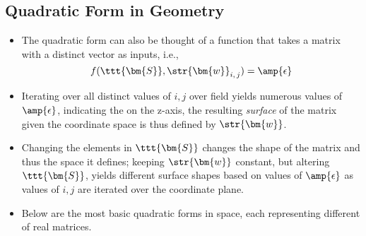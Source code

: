 \begin{itemize}
  \subsection{Quadratic Form in Geometry}\label{Quadratic Form in Geometry}
  \begin{itemize}
    \item The quadratic form can also be thought of a function that takes a matrix with a distinct vector as inputs, i.e.,
    \[%
    f(\ttt{\bm{S}},\str{\bm{w}}_{i,\, j}) = \amp{\epsilon}
    \]%
    \item Iterating over all distinct values of \(i, j\) over field yields numerous values of \(\amp{\epsilon}\), indicating the  on the z-axis, the resulting \emph{surface} of the matrix given the coordinate space is thus defined by \(\str{\bm{w}}\).
    \item Changing the elements in \(\ttt{\bm{S}}\) changes the shape of the matrix and thus the space it defines; keeping \(\str{\bm{w}}\) constant, but altering \(\ttt{\bm{S}}\), yields different surface shapes based on values of \(\amp{\epsilon}\) as values of \(i, j\) are iterated over the coordinate plane.
    \item Below are the most basic quadratic forms in space, each representing different \hyperref[Definiteness]{} of real matrices.
    \medskip
    \begin{center}
        \\
\end{center}
\end{itemize}
\end{itemize}
